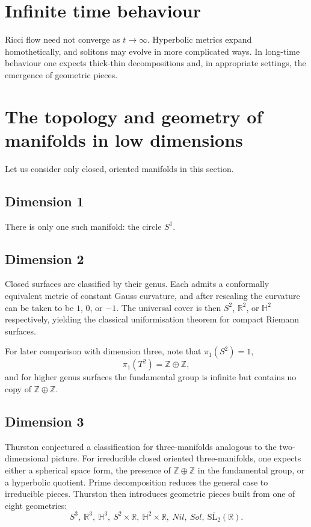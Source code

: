 \section*{Infinite time behaviour}

Ricci flow need not converge as $t\to\infty$. Hyperbolic metrics expand
homothetically, and solitons may evolve in more complicated ways. In
long-time behaviour one expects thick-thin decompositions and, in appropriate
settings, the emergence of geometric pieces.

\section{The topology and geometry of manifolds in low dimensions}

Let us consider only closed, oriented manifolds in this section.

\subsection{Dimension 1}

There is only one such manifold: the circle $S^1$.

\subsection{Dimension 2}

Closed surfaces are classified by their genus. Each admits a conformally
equivalent metric of constant Gauss curvature, and after rescaling the
curvature can be taken to be $1$, $0$, or $-1$. The universal cover is then
$S^2$, $\mathbb R^2$, or $\mathbb H^2$ respectively, yielding the classical
uniformisation theorem for compact Riemann surfaces.

For later comparison with dimension three, note that $\pi_1(S^2)=1$,
\[
\pi_1(T^2)=\mathbb Z\oplus\mathbb Z,
\]
and for higher genus surfaces the fundamental group is infinite but contains
no copy of $\mathbb Z\oplus\mathbb Z$.

\subsection{Dimension 3}

Thurston conjectured a classification for three-manifolds analogous to the
two-dimensional picture. For irreducible closed oriented three-manifolds, one
expects either a spherical space form, the presence of
$\mathbb Z\oplus\mathbb Z$ in the fundamental group, or a hyperbolic quotient.
Prime decomposition reduces the general case to irreducible pieces. Thurston
then introduces geometric pieces built from one of eight geometries:
\[
S^3,\ \mathbb R^3,\ \mathbb H^3,\ S^2\times\mathbb R,\ \mathbb H^2\times\mathbb R,\ Nil,\ Sol,\ \overline{\mathrm{SL}_2}(\mathbb R).
\]

